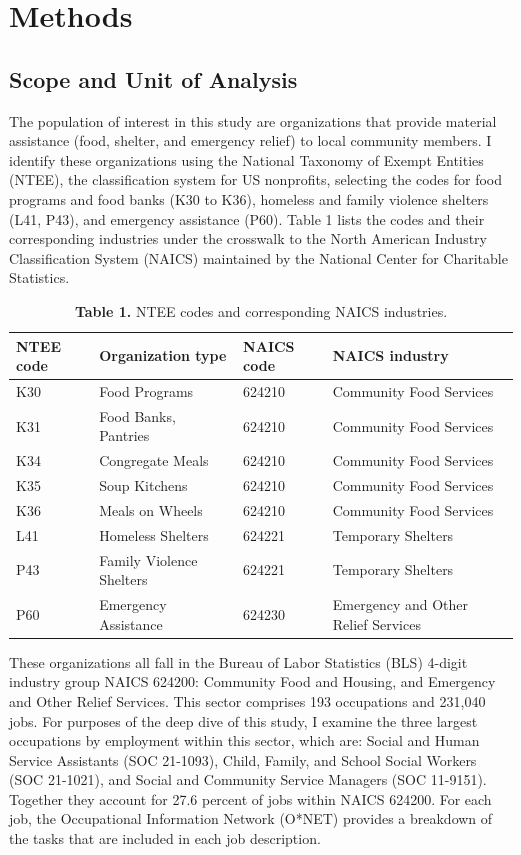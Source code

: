 \section{Methods}

\subsection{Scope and Unit of Analysis}

The population of interest in this study are organizations that provide material assistance (food, shelter, and emergency relief) to local community members. I identify these organizations using the National Taxonomy of Exempt Entities (NTEE), the classification system for US nonprofits, selecting the codes for food programs and food banks (K30 to K36), homeless and family violence shelters (L41, P43), and emergency assistance (P60). Table 1 lists the codes and their corresponding industries under the crosswalk to the North American Industry Classification System (NAICS) maintained by the National Center for Charitable Statistics.

\begin{table}[!htbp]
\tablesize
\caption*{\textbf{Table 1.} NTEE codes and corresponding NAICS industries.}
\begin{tabularx}{\textwidth}{@{}l l l X@{}}
\toprule
NTEE code & Organization type & NAICS code & NAICS industry \\
\midrule
K30 & Food Programs & 624210 & Community Food Services \\
K31 & Food Banks, Pantries & 624210 & Community Food Services \\
K34 & Congregate Meals & 624210 & Community Food Services \\
K35 & Soup Kitchens & 624210 & Community Food Services \\
K36 & Meals on Wheels & 624210 & Community Food Services \\
L41 & Homeless Shelters & 624221 & Temporary Shelters \\
P43 & Family Violence Shelters & 624221 & Temporary Shelters \\
P60 & Emergency Assistance & 624230 & Emergency and Other Relief Services \\
\bottomrule
\end{tabularx}
\end{table}

These organizations all fall in the Bureau of Labor Statistics (BLS) 4-digit industry group NAICS 624200: Community Food and Housing, and Emergency and Other Relief Services. This sector comprises 193 occupations and 231,040 jobs. For purposes of the deep dive of this study, I examine the three largest occupations by employment within this sector, which are: Social and Human Service Assistants (SOC 21-1093), Child, Family, and School Social Workers (SOC 21-1021), and Social and Community Service Managers (SOC 11-9151). Together they account for 27.6 percent of jobs within NAICS 624200. For each job, the Occupational Information Network (O*NET) provides a breakdown of the tasks that are included in each job description.

